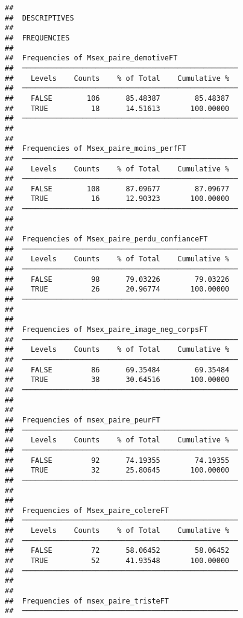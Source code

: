 \documentclass[
]{article}
\begin{document}
\begin{verbatim}
## 
##  DESCRIPTIVES
## 
##  FREQUENCIES
## 
##  Frequencies of Msex_paire_demotiveFT               
##  ────────────────────────────────────────────────── 
##    Levels    Counts    % of Total    Cumulative %   
##  ────────────────────────────────────────────────── 
##    FALSE        106      85.48387        85.48387   
##    TRUE          18      14.51613       100.00000   
##  ────────────────────────────────────────────────── 
## 
## 
##  Frequencies of Msex_paire_moins_perfFT             
##  ────────────────────────────────────────────────── 
##    Levels    Counts    % of Total    Cumulative %   
##  ────────────────────────────────────────────────── 
##    FALSE        108      87.09677        87.09677   
##    TRUE          16      12.90323       100.00000   
##  ────────────────────────────────────────────────── 
## 
## 
##  Frequencies of Msex_paire_perdu_confianceFT        
##  ────────────────────────────────────────────────── 
##    Levels    Counts    % of Total    Cumulative %   
##  ────────────────────────────────────────────────── 
##    FALSE         98      79.03226        79.03226   
##    TRUE          26      20.96774       100.00000   
##  ────────────────────────────────────────────────── 
## 
## 
##  Frequencies of Msex_paire_image_neg_corpsFT        
##  ────────────────────────────────────────────────── 
##    Levels    Counts    % of Total    Cumulative %   
##  ────────────────────────────────────────────────── 
##    FALSE         86      69.35484        69.35484   
##    TRUE          38      30.64516       100.00000   
##  ────────────────────────────────────────────────── 
## 
## 
##  Frequencies of msex_paire_peurFT                   
##  ────────────────────────────────────────────────── 
##    Levels    Counts    % of Total    Cumulative %   
##  ────────────────────────────────────────────────── 
##    FALSE         92      74.19355        74.19355   
##    TRUE          32      25.80645       100.00000   
##  ────────────────────────────────────────────────── 
## 
## 
##  Frequencies of Msex_paire_colereFT                 
##  ────────────────────────────────────────────────── 
##    Levels    Counts    % of Total    Cumulative %   
##  ────────────────────────────────────────────────── 
##    FALSE         72      58.06452        58.06452   
##    TRUE          52      41.93548       100.00000   
##  ────────────────────────────────────────────────── 
## 
## 
##  Frequencies of msex_paire_tristeFT                 
##  ────────────────────────────────────────────────── 

\end{verbatim}
\end{document}
